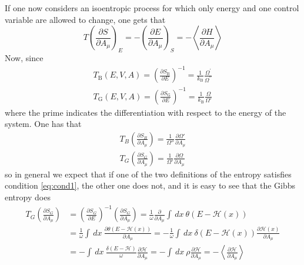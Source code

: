 If one now considers an isoentropic process for which only energy and one control variable are allowed to change, one gets that
\begin{equation}
    T\left(\frac{\partial S}{\partial A_{\mu}}\right)_{E}=-\left(\frac{\partial E}{\partial A_{\mu}}\right)_{S}=-\left\langle\frac{\partial H}{\partial A_{\mu}}\right\rangle
    \label{eq:cond1}
\end{equation}
Now, since
\begin{equation}
    \begin{array}{l}
        T_{\mathrm{B}}(E, V, A)=\left(\frac{\partial S_{\mathrm{B}}}{\partial E}\right)^{-1} = \frac{1}{k_{\mathrm{B}}} \frac{\Omega^{\prime}}{\Omega^{\prime \prime}} \\
        T_{\mathrm{G}}(E, V, A)=\left(\frac{\partial S_{\mathrm{G}}}{\partial E}\right)^{-1}=\frac{1}{k_{\mathrm{B}}} \frac{\Omega}{\Omega'}
        \end{array}
    \label{eq:temperatures_definition}
\end{equation}
where the prime indicates the differentiation with respect to the energy of the system. One has that 
\begin{gather*}
    T_B \left(\frac{\partial S_B}{\partial A_{\mu}}\right) = \frac{1}{\Omega''} \frac{\partial \Omega'}{\partial A_{\mu}} \\
    T_G \left(\frac{\partial S_G}{\partial A_{\mu}}\right) = \frac{1}{\Omega'} \frac{\partial \Omega}{\partial A_{\mu}}
\end{gather*}
so in general we expect that if one of the two definitions of the entropy satisfies condition \ref{eq:cond1}, the other one does not, and it is easy to see that the Gibbs entropy does
\begin{equation*}\begin{aligned}
    T_{G}\left(\frac{\partial S_{G}}{\partial A_{\mu}}\right) &=\left(\frac{\partial S_{G}}{\partial E}\right)^{-1}\left(\frac{\partial S_{G}}{\partial A_{\mu}}\right)=\frac{1}{\omega} \frac{\partial}{\partial A_{\mu}} \int \, dx \ \theta(E-\mathcal{H}(x)) \\
    &=\frac{1}{\omega} \int \, dx \ \frac{\partial \theta(E-\mathcal{H}(x))}{\partial A_{\mu}} = -\frac{1}{\omega} \int \, dx \ \delta(E-\mathcal{H}(x)) \frac{\partial \mathcal{H}(x)}{\partial A_{\mu}} \\
    &=-\int \, dx \ \frac{\delta(E-\mathcal{H})}{\omega} \frac{\partial \mathcal{H}}{\partial A_{\mu}} = -\int \, dx \ \rho \frac{\partial \mathcal{H}}{\partial A_{\mu}} = -\left\langle\frac{\partial \mathcal{H}}{\partial A_{\mu}}\right\rangle
\end{aligned}\end{equation*}
